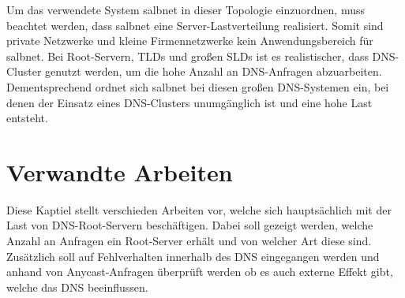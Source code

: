 \documentclass[a4paper, 12pt, BCOR10mm, DIV12, toc=bibliography, toc=listof, german]{scrbook}
\begin{document}
			Um das verwendete System salbnet in dieser Topologie einzuordnen, muss beachtet werden, dass
			salbnet eine Server-Lastverteilung realisiert. Somit sind private Netzwerke und kleine
			Firmennetzwerke kein Anwendungsbereich für salbnet. Bei Root-Servern, TLDs und großen SLDs ist
			es realistischer, dass DNS-Cluster genutzt werden, um die hohe Anzahl an DNS-Anfragen
			abzuarbeiten. Dementsprechend ordnet sich salbnet bei diesen großen DNS-Systemen ein, bei denen
			der Einsatz eines DNS-Clusters unumgänglich ist und eine hohe Last entsteht.
		



	\chapter{Verwandte Arbeiten} %
	\label{cha:arbeiten}

	Diese Kaptiel stellt verschieden Arbeiten vor, welche sich hauptsächlich mit der Last von
	DNS-Root-Servern beschäftigen. Dabei soll gezeigt werden, welche Anzahl an Anfragen ein
	Root-Server erhält und von welcher Art diese sind. Zusätzlich soll auf Fehlverhalten innerhalb des
	DNS eingegangen werden und anhand von Anycast-Anfragen überprüft werden ob es auch externe Effekt
	gibt, welche das DNS beeinflussen.
\end{document}
